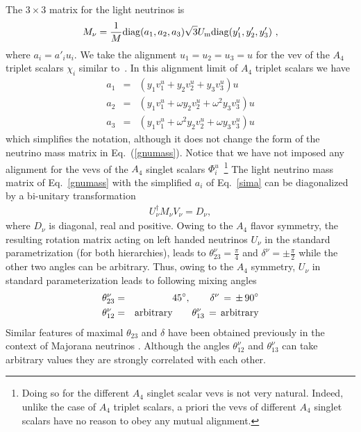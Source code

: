 \documentclass[english,10pt,aps,prd,a4paper,preprintnumbers,floatfix,nofootinbib,showpacs,superscriptaddress]{revtex4-1}
\begin{document}
  The $3\times 3$ matrix for the light neutrinos is
%
  \begin{eqnarray}
   M_{\nu} = \frac{1}{M}\mathrm{diag}(a_1, a_2, a_3)\sqrt{3}U_{\rm m}\mathrm{diag}(y'_1,y'_2,y'_3)~,
   \label{gnumass}
  \end{eqnarray}
  where $a_i = a'_i u_i$. We take the alignment $u_1 = u_2 = u_3 = u$
  for the vev of the $A_4$ triplet scalars $\chi_i$ similar
  to~\cite{Babu:2002dz, Ma:2001dn}. In this alignment limit of $A_4$
  triplet scalars we have 
   \begin{eqnarray}
   a_1 &=& (y_1 v_1^u + y_2v_2^u + y_3v_3^u) u \nonumber  \\
   a_2 &= &(y_1v_1^u + \omega y_2v_2^u + \omega^2y_3v_3^u) u \nonumber \\
   a_3 &=& (y_1v_1^u  + \omega ^2 y_2v_2^u + \omega y_3v_3^u ) u 
   \label{sima}
  \end{eqnarray}
  which simplifies the notation, although it does not change the form
  of the neutrino mass matrix in Eq.~(\ref{gnumass}). Notice that we
  have not imposed any alignment for the vevs of the $A_4$ singlet
  scalars $\Phi^u_i$~\footnote{Doing so for the different $A_4$
    singlet scalar vevs is not very natural. Indeed, unlike the case
    of $A_4$ triplet scalars, a priori the vevs of different $A_4$
    singlet scalars have no reason to obey any mutual alignment. }
%
  The light neutrino mass matrix of Eq.~\ref{gnumass} with the
  simplified $a_i$ of Eq.~\ref{sima} can be diagonalized by a
  bi-unitary transformation
%
\begin{eqnarray}
U_\nu^\dagger M_\nu V_\nu = D_\nu,
\label{biunit}
\end{eqnarray}
%
where $D_\nu$ is diagonal, real and positive. Owing to the $A_4$
flavor symmetry, the resulting rotation matrix acting on left handed
neutrinos $U_\nu$ in the standard parametrization (for both
hierarchies), leads to $\theta^\nu_{23} = \frac{\pi}{4}$ and
$\delta^\nu = \pm \frac{\pi}{2}$ while the other two angles can be
arbitrary. Thus, owing to the $A_4$ symmetry, $U_\nu$ in standard
parameterization leads to following mixing angles
%
\begin{eqnarray}
 \theta^\nu_{23} & = & 45^\circ,  \quad \quad \delta^\nu \, = \, \pm \, 90^\circ  \nonumber \\
 \theta^\nu_{12} & = & \rm{arbitrary} \quad \quad  \theta^\nu_{13} \, = \, \rm{arbitrary} 
 \label{unu}
\end{eqnarray}
%
Similar features of maximal $\theta_{23}$ and $\delta$ have been
obtained previously in the context of Majorana neutrinos
\cite{Babu:2002dz,Ma:2015pma}.  Although the angles $\theta^\nu_{12}$
and $\theta^\nu_{13}$ can take arbitrary values they are strongly
correlated with each other. 
\end{document}
